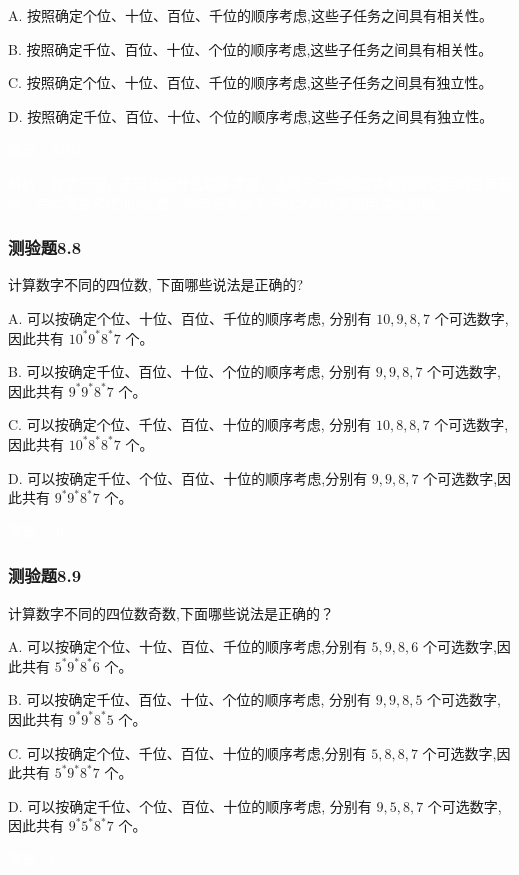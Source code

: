 \documentclass[UTF8, heading=true]{ctexart}
\begin{document}
A. 按照确定个位、十位、百位、千位的顺序考虑,这些子任务之间具有相关性。

B. 按照确定千位、百位、十位、个位的顺序考虑,这些子任务之间具有相关性。

C. 按照确定个位、十位、百位、千位的顺序考虑,这些子任务之间具有独立性。

D. 按照确定千位、百位、十位、个位的顺序考虑,这些子任务之间具有独立性。

\textcolor{white}{答案：ABD}

\textcolor{white}{解析：数字不同，不管按照什么顺序考虑，选择了一位的数字都会对之后的位有影响。其次需要考虑0的位置，只有先考虑了千位才可以直接用乘法原理。}


\subsubsection{测验题8.8}
计算数字不同的四位数, 下面哪些说法是正确的?

A. 可以按确定个位、十位、百位、千位的顺序考虑, 分别有 $10,9,8,7$ 个可选数字, 因此共有 $10^* 9 ^* 8^* 7$ 个。

B. 可以按确定千位、百位、十位、个位的顺序考虑, 分别有 $9,9,8,7$ 个可选数字,因此共有 $9^* 9^* 8^* 7$ 个。

C. 可以按确定个位、千位、百位、十位的顺序考虑, 分别有 $10,8,8,7$ 个可选数字, 因此共有 $10^* 8^* 8^* 7$ 个。

D. 可以按确定千位、个位、百位、十位的顺序考虑,分别有 $9,9,8,7$ 个可选数字,因此共有 $9^* 9^* 8^* 7$ 个。

\textcolor{white}{答案：BD}

\subsubsection{测验题8.9}

计算数字不同的四位数奇数,下面哪些说法是正确的？

A. 可以按确定个位、十位、百位、千位的顺序考虑,分别有 $5,9,8,6$ 个可选数字,因此共有 $5^* 9^* 8^* 6$ 个。

B. 可以按确定千位、百位、十位、个位的顺序考虑, 分别有 $9,9,8,5$ 个可选数字, 因此共有 $9 ^* 9 ^* 8 ^* 5$ 个。

C. 可以按确定个位、千位、百位、十位的顺序考虑,分别有 $5,8,8,7$ 个可选数字,因此共有 $5 ^* 9 ^* 8 ^* 7$ 个。

D. 可以按确定千位、个位、百位、十位的顺序考虑, 分别有 $9,5,8,7$ 个可选数字, 因此共有 $9 ^* 5^* 8^* 7$ 个。

\textcolor{white}{答案：C}
\end{document}

